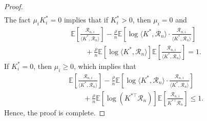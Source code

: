 \documentclass[10pt,a4paper]{amsart}
\begin{document}
\begin{proof}
\begin{align*}
    \end{align*}
    The fact $\mu_i K_i^*=0$ implies that if $K_i^* > 0$, then $\mu_i = 0$ and
    \begin{align*}
        & \mathbb{E}\left[ \frac{\mathcal{R}_{n,i}}{ \langle K^{*}, \mathcal{R}_n \rangle } \right] 
        - \frac{\rho}{n} \mathbb{E}\left[ \log \langle K^{*}, \mathcal{R}_n \rangle \cdot \frac{\mathcal{R}_{n,i}}{\langle K^{*}, \mathcal{R}_n \rangle } \right] \\
        &\qquad + \frac{\rho}{n}\mathbb{E}\left[ \log \langle K^{*}, \mathcal{R}_n \rangle \right] \mathbb{E}\left[ \frac{\mathcal{R}_{n,i}}{\langle K^{*}, \mathcal{R}_n \rangle} \right] = 1.
    \end{align*}
    If $K_i^* = 0$, then $\mu_i \geq 0$, which implies that
    \begin{align*}
        & \mathbb{E}\left[ \frac{\mathcal{R}_{n,i}}{\langle K^{*}, \mathcal{R}_n \rangle } \right] - \frac{\rho}{n}\mathbb{E} \left[ \log \langle K^{*}, \mathcal{R}_n \rangle  \cdot \frac{\mathcal{R}_{n,i}}{\langle K^{*}, \mathcal{R}_n \rangle } \right] \\
        &\qquad +\frac{\rho}{n}\mathbb{E}\left[ \log(K^{*\top}\mathcal{R}_n) \right] \mathbb{E}\left[ \frac{\mathcal{R}_{n,i}}{K^{*\top}\mathcal{R}_n} \right] \leq 1.
    \end{align*}
Hence, the proof is complete.    
\end{proof}
\end{document}
